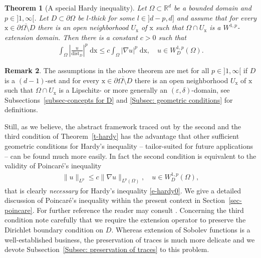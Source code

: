 \documentclass[10pt,leqno]{amsart}
\newtheorem{theorem}{Theorem}[section]
\theoremstyle{definition}
\newtheorem{remark}[theorem]{Remark}
\numberwithin{equation}{section}
\begin{document}
\begin{theorem}[A special Hardy inequality] \label{t-hardy concrete}
 Let $\Omega \subset {{\mathbb R}}^d$ be a bounded domain and $p \in {]1,\infty[}$. Let $D
 \subset \partial \Omega$ be $l$-thick for some $l \in {]d-p,d]}$ and assume
 that for every ${{\mathrm x}} \in \overline{\partial\Omega \setminus D}$ there is an open
 neighborhood $U_{{\mathrm x}}$ of ${{\mathrm x}}$ such that $\Omega \cap U_\mathrm x$ is a
 $W^{1,p}$-extension domain. Then there is a constant $c >0$ such that
 \begin{align*}
  \int_\Omega \left| \frac{u}{{\operatorname{dist}}_D} \right|^p \; {{\mathrm{d}}} \mathrm{x} \le c
	\int_\Omega |\nabla u|^p \; {{\mathrm{d}}} \mathrm{x}, \quad u \in
 W_D^{1,p}(\Omega).
 \end{align*}
\end{theorem}

\begin{remark}
The assumptions in the above theorem are met for all $p \in {]1,\infty[}$ if $D$
is a $(d-1)$-set and for every ${{\mathrm x}} \in \overline{\partial\Omega \setminus D}$
there is an open neighborhood $U_{{\mathrm x}}$ of ${{\mathrm x}}$ such that $\Omega \cap U_\mathrm x$
is a Lipschitz- or more generally an $({\varepsilon},\delta)$-domain, see
Subsections~\ref{subsec-concepts for D} and \ref{Subsec: geometric
conditions} for definitions.
\end{remark}

Still, as we believe, the abstract framework traced out by the second and the
third condition of Theorem~\ref{t-hardy} has the advantage that other sufficient
geometric conditions for Hardy's inequality -- tailor-suited for future
applications -- can be found much more easily. In fact the second condition is
equivalent to the validity of Poincar\'e's inequality
 \begin{align*}
  \|u\|_{L^p} \le c \|\nabla u\|_{L^p(\Omega)},
  \quad u \in W^{1,p}_D(\Omega),
 \end{align*}
that is clearly \emph{necessary} for Hardy's inequality \eqref{e-hardy0}. We
give a detailed discussion of Poincar\'e's inequality within the
present context in Section~\ref{sec-poincare}. For further reference the reader
may consult \cite[Ch.\ 4]{ziemer}. Concerning the third condition note carefully
that we require the extension operator to preserve the Dirichlet boundary
condition on $D$. Whereas extension of Sobolev functions is a well-established
business, the preservation of traces is much more delicate and we devote
Subsection~\ref{Subsec: preservation of traces} to this problem.
\end{document}
